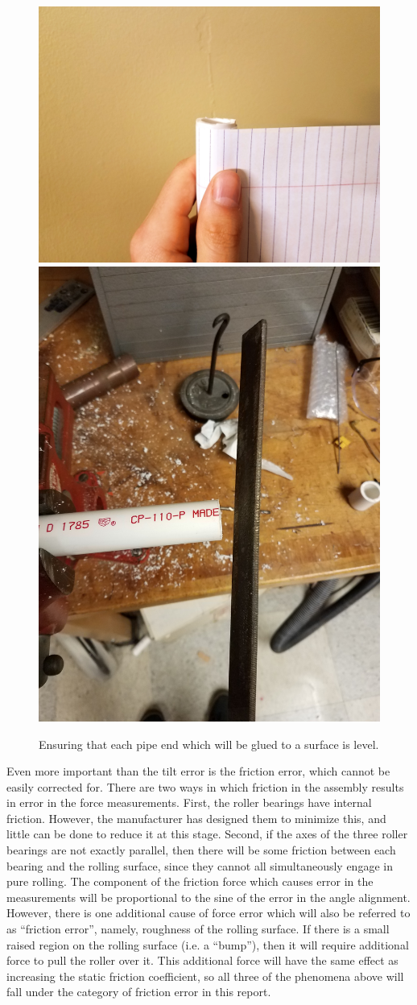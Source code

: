 \documentclass[12pt]{report} %
\begin{document}
\begin{figure}
\includegraphics[width = 0.49\linewidth]{perpendicular.jpg}
\includegraphics[width = 0.49\linewidth]{leveling.jpg}
\centering
\caption{Ensuring that each pipe end which will be glued to a surface is level.}
\label{end_normalizing}
\end{figure}

Even more important than the tilt error is the friction error, which cannot be easily corrected for. There are two ways in which
friction in the assembly results in error in the force measurements. First, the roller bearings have internal friction. However,
the manufacturer has designed them to minimize this, and little can be done to reduce it at this stage. Second, if the axes of the
three roller bearings are not exactly parallel, then there will be some friction between each bearing and the rolling surface,
since they cannot all simultaneously engage in pure rolling. The component of the friction force which causes error in the
measurements will be proportional to the sine of the error in the angle alignment. However, there is one additional cause of
force error which will also be referred to as ``friction error'', namely, roughness of the rolling surface. If there is a small
raised region on the rolling surface (i.e. a ``bump''), then it will require additional force to pull the roller over it. This
additional force will have the same effect as increasing the static friction coefficient, so all three of the phenomena
above will fall under the category of friction error in this report.
\end{document}
